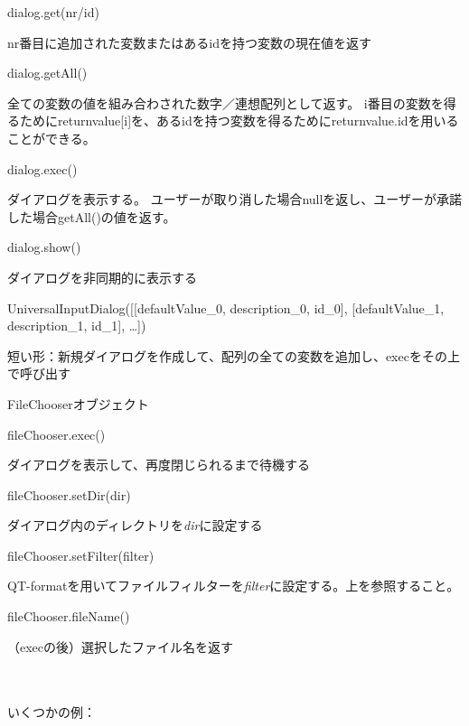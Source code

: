 \documentclass[]{book}
\begin{document}
dialog.get(nr/id)

nr番目に追加された変数またはあるidを持つ変数の現在値を返す

dialog.getAll()

全ての変数の値を組み合わされた数字／連想配列として返す。
i番目の変数を得るためにreturnvalue{[}i{]}を、あるidを持つ変数を得るためにreturnvalue.idを用いることができる。

dialog.exec()

ダイアログを表示する。
ユーザーが取り消した場合nullを返し、ユーザーが承諾した場合getAll()の値を返す。

dialog.show()

ダイアログを非同期的に表示する

UniversalInputDialog({[}{[}defaultValue\_0, description\_0, id\_0{]},
{[}defaultValue\_1, description\_1, id\_1{]}, \ldots{}{]})

短い形：新規ダイアログを作成して、配列の全ての変数を追加し、execをその上で呼び出す

FileChooserオブジェクト

fileChooser.exec()

ダイアログを表示して、再度閉じられるまで待機する

fileChooser.setDir(dir)

ダイアログ内のディレクトリを\emph{dir}に設定する

fileChooser.setFilter(filter)

QT-formatを用いてファイルフィルターを\emph{filter}に設定する。上を参照すること。

fileChooser.fileName()

（execの後）選択したファイル名を返す

\\\\

いくつかの例：
\end{document}
